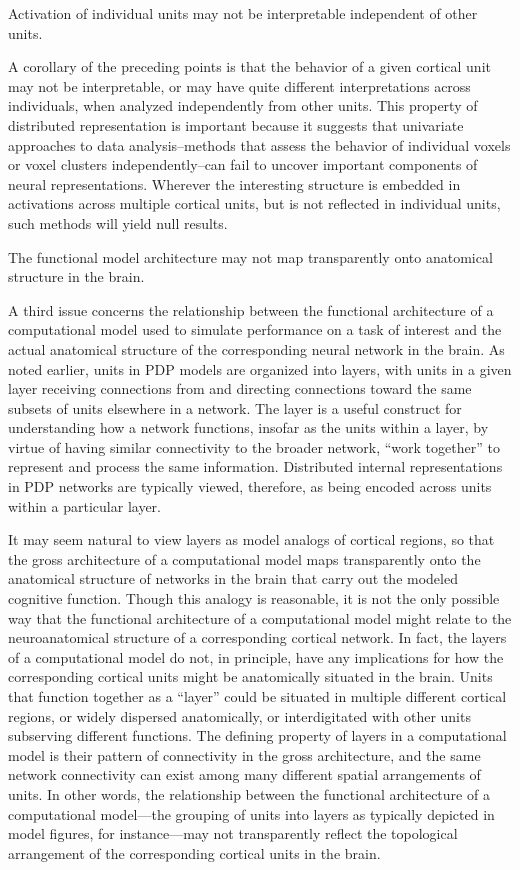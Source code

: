 \begin{APAenumerate}
\item Activation of individual units may not be interpretable independent of other units.

A corollary of the preceding points is that the behavior of a given cortical unit may not be interpretable, or may have quite different interpretations across individuals, when analyzed independently from other units. This property of distributed representation is important because it suggests that univariate approaches to data analysis--methods that assess the behavior of individual voxels or voxel clusters independently--can fail to uncover important components of neural representations. Wherever the interesting structure is embedded in activations across multiple cortical units, but is not reflected in individual units, such methods will yield null results.

\item The functional model architecture may not map transparently onto anatomical structure in the brain.

A third issue concerns the relationship between the functional architecture of a computational model used to simulate performance on a task of interest and the actual anatomical structure of the corresponding neural network in the brain.  As noted earlier, units in PDP models are organized into layers, with units in a given layer receiving connections from and directing connections toward the same subsets of units elsewhere in a network. The layer is a useful construct for understanding how a network functions, insofar as the units within a layer, by virtue of having similar connectivity to the broader network, ``work together'' to represent and process the same information. Distributed internal representations in PDP networks are typically viewed, therefore, as being encoded across units within a particular layer.  

It may seem natural to view layers as model analogs of cortical regions, so that the gross architecture of a computational model maps transparently onto the anatomical structure of networks in the brain that carry out the modeled cognitive function. Though this analogy is reasonable, it is not the only possible way that the functional architecture of a computational model might relate to the neuroanatomical structure of a corresponding cortical network. In fact, the layers of a computational model do not, in principle, have any implications for how the corresponding cortical units might be anatomically situated in the brain. Units that function together as a ``layer'' could be situated in multiple different cortical regions, or widely dispersed anatomically, or interdigitated with other units subserving different functions. The defining property of layers in a computational model is their pattern of connectivity in the gross architecture, and the same network connectivity can exist among many different spatial arrangements of units. In other words, the relationship between the functional architecture of a computational model---the grouping of units into layers as typically depicted in model figures, for instance---may not transparently reflect the topological arrangement of the corresponding cortical units in the brain. 


\end{APAenumerate}
